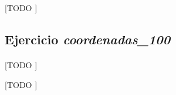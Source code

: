 \documentclass[spanish]{article}
\begin{document}
			\begin{table}[p]
				\begin{center}
				\end{center}
				\caption{[TODO ]}
				\label{}
			\end{table}

		\subsection{Ejercicio \emph{coordenadas\_100}}
		\label{sec:e-8c}

			\paragraph{}
			[TODO ]

			\begin{table}[p]
				\begin{center}
				\end{center}
				\caption{[TODO ]}
				\label{}
			\end{table}

	\nocite{subject:mio}
	\nocite{garciparedes:mosel-examples}
	
  
\end{document}
